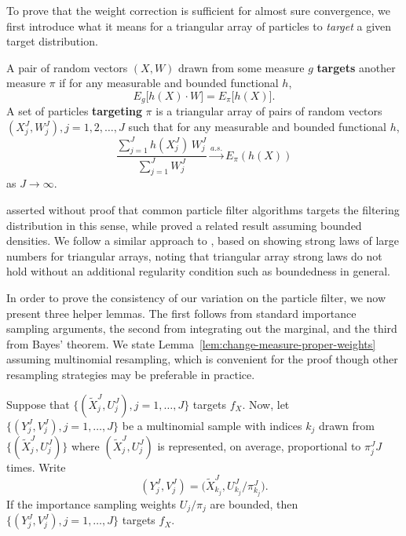 To prove that the weight correction is sufficient for almost sure convergence, we first introduce what it means for a triangular array of particles to \textit{target} a given target distribution. 

\begin{defn}[Targeting]
    A pair of random vectors $(X, W)$ drawn from some measure $g$ \textbf{targets} another measure $\pi$ if for any measurable and bounded functional $h$,
\begin{equation}
    E_g\big[h(X) \cdot W\big]=E_\pi\big[h(X)\big].
\end{equation}  
    A set of particles \textbf{targeting} $\pi$ is a triangular array of pairs of random vectors $(X^J_j, W^J_j), j=1,2, \ldots,J$ such that for any measurable and bounded functional $h$,
\begin{equation}
    \frac{\sum_{j=1}^J h(X^J_j) \, W^J_j}{\sum_{j=1}^J W^J_j} \stackrel{a.s.}{\to} E_\pi(h(X))
\end{equation}
as $J \to \infty$.
\end{defn}
\cite{chopin04} asserted without proof that common particle filter algorithms targets the filtering distribution in this sense, while \cite{chopin20} proved a related result assuming bounded densities.
We follow a similar approach to \cite{chopin20}, based on showing strong laws of large numbers for triangular arrays, noting that triangular array strong laws do not hold without an additional regularity condition such as boundedness in general.
 
In order to prove the consistency of our variation on the particle filter, we now present three helper lemmas.
The first follows from standard importance sampling arguments, the second from integrating out the marginal, and the third from Bayes' theorem. 
We state Lemma~\ref{lem:change-measure-proper-weights} assuming multinomial resampling, which is convenient for the proof though other resampling strategies may be preferable in practice.

\begin{lem}
    \label{lem:change-measure-proper-weights}
    Suppose that $\{(\tilde X_j^J,U_j^J),j=1,\dots,J\}$ targets $f_X$. Now, let $\{(Y_j^J,V_j^J),j=1,\dots,J\}$ be a multinomial sample with indices $k_j$ drawn from $\{(\tilde X_j^J,U_j^J)\}$ where $(\tilde X_j^J,U_j^J)$ is represented, on average, proportional to $\pi^J_j J$ times. Write
    \begin{equation}
    (Y_j^J,V_j^J) = \big(\tilde X^J_{k_j},U^J_{k_j}\big/\pi^J_{k_j}\big).
    \end{equation} 
    If the importance sampling weights $U_j/\pi_j$ are bounded, then $\{(Y^J_j,V^J_j),j=1,\dots,J\}$ targets $f_X$.
\end{lem}

